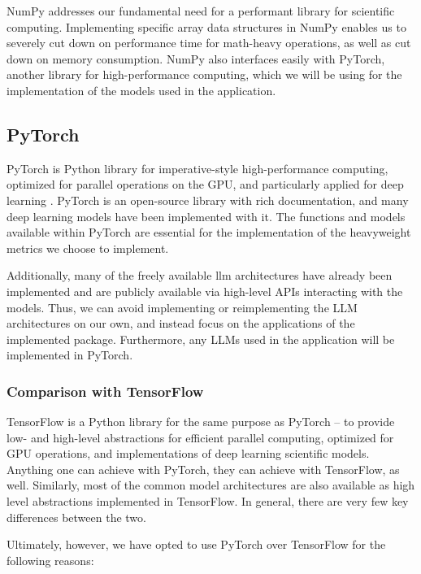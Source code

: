 NumPy addresses our fundamental need for a performant library for scientific computing. Implementing specific array data structures in NumPy enables us to severely cut down on performance time for math-heavy operations, as well as cut down on memory consumption. NumPy also interfaces easily with PyTorch, another library for high-performance computing, which we will be using for the implementation of the models used in the application.

\subsection{PyTorch}
PyTorch is Python library for imperative-style high-performance computing, optimized for parallel operations on the GPU, and particularly applied for deep learning \citep{NEURIPS2019_9015_pytorch}. PyTorch is an open-source library with rich documentation, and many deep learning models have been implemented with it. The functions and models available within PyTorch are essential for the implementation of the heavyweight metrics we choose to implement. 

Additionally, many of the freely available \acrfull{llm} architectures have already been implemented and are publicly available via high-level APIs interacting with the models. Thus, we can avoid implementing or reimplementing the LLM architectures on our own, and instead focus on the applications of the implemented package. Furthermore, any LLMs used in the application will be implemented in PyTorch.

\subsubsection*{\textbf{Comparison with TensorFlow}}
TensorFlow is a Python library for the same purpose as PyTorch -- to provide low- and high-level abstractions for efficient parallel computing, optimized for GPU operations, and implementations of deep learning scientific models. Anything one can achieve with PyTorch, they can achieve with TensorFlow, as well. Similarly, most of the common model architectures are also available as high level abstractions implemented in TensorFlow. In general, there are very few key differences between the two.

Ultimately, however, we have opted to use PyTorch over TensorFlow for the following reasons:

